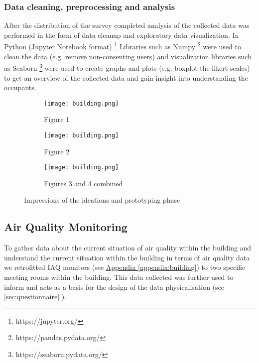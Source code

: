 \subsubsection{Data cleaning, preprocessing and analysis}
\label{sec:analysis}
After the distribution of the survey completed analysis of the collected data was performed in the form of data cleanup and exploratory data visualization. In Python (Jupyter Notebook format) \footnote{https://jupyter.org/} Libraries such as Numpy \footnote{https://pandas.pydata.org/} were used to clean the data (e.g. remove non-consenting users) and visualization libraries such as Seaborn \footnote{https://seaborn.pydata.org/} were used to create graphs and plots (e.g. boxplot the likert-scales) to get an overview of the collected data and gain insight into understanding the occupants.

\begin{figure*}[!t]
    \centering
    \begin{subfigure}[b]{0.23\textwidth}
        \texttt{[image: building.png]}
        \caption{Figure 1}
        \label{fig:1}
    \end{subfigure}
    \hfill
    \begin{subfigure}[b]{0.23\textwidth}
        \texttt{[image: building.png]}
        \caption{Figure 2}
        \label{fig:2}
    \end{subfigure}
    \hfill
    \begin{subfigure}[b]{0.5\textwidth}
        \texttt{[image: building.png]}
        \caption{Figures 3 and 4 combined}
        \label{fig:3_4_combined}
    \end{subfigure}
    \caption{Impressions of the ideations and prototyping phase}
    \label{fig:full_width}
\end{figure*}

\subsection{Air Quality Monitoring}

To gather data about the current situation of air quality within the building and understand the current situation within the building in terms of air quality data we retrofitted IAQ monitors (see \hyperref[appendix:building]{Appendix \ref*{appendix:building}}) to two specific meeting rooms within the building.  This data collected was further used to inform and acts as a basis for the design of the data physicalisation (see \ref{sec:questionnaire} ).

